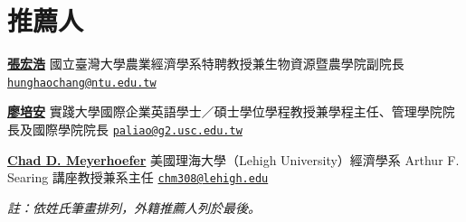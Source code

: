 \documentclass[11pt,letterpaper]{article}
\begin{document}
\section{推薦人}\label{ux63a8ux85a6ux4eba}

\begingroup\raggedright{}\href{https://sites.google.com/view/hh-chang}{\textbf{張宏浩}}
\newline{} 國立臺灣大學農業經濟學系特聘教授兼生物資源暨農學院副院長
\newline{}
\href{mailto:hunghaochang@ntu.edu.tw}{\nolinkurl{hunghaochang@ntu.edu.tw}}\par\nopagebreak\endgroup

\begingroup\raggedright{}\href{https://uscetp.usc.edu.tw/var/file/102/1102/img/149873815.pdf}{\textbf{廖培安}}
\newline{}
實踐大學國際企業英語學士／碩士學位學程教授兼學程主任、管理學院院長及國際學院院長
\newline{}
\href{mailto:paliao@g2.usc.edu.tw}{\nolinkurl{paliao@g2.usc.edu.tw}}\par\nopagebreak\endgroup

\begingroup\raggedright{}\href{https://business.lehigh.edu/directory/chad-d-meyerhoefer}{\textbf{Chad
D. Meyerhoefer}} \newline{} 美國理海大學（Lehigh University）經濟學系
Arthur F. Searing 講座教授兼系主任 \newline{}
\href{mailto:chm308@lehigh.edu}{\nolinkurl{chm308@lehigh.edu}}\par\nopagebreak\endgroup

\vspace{2pt}
\noindent\textit{\small 註：依姓氏筆畫排列，外籍推薦人列於最後。}
\end{document}
